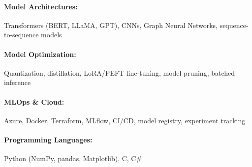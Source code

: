 \documentclass[10pt, letterpaper]{article}
\newenvironment{highlights}{
    \begin{itemize}[
        topsep=0.10 cm,
        parsep=0.10 cm,
        partopsep=0pt,
        itemsep=0pt,
        leftmargin=0 cm + 10pt
    ]
}{
    \end{itemize}
} %
\newenvironment{onecolentry}{
    \begin{adjustwidth}{
        0 cm + 0.00001 cm
    }{
        0 cm + 0.00001 cm
    }
}{
    \end{adjustwidth}
} %
\begin{document}
        \paragraph{Model Architectures:} Transformers (BERT, LLaMA, GPT), CNNs, Graph Neural Networks, sequence-to-sequence models
        \vspace{-4mm}
        \paragraph{Model Optimization:} Quantization, distillation, LoRA/PEFT fine-tuning, model pruning, batched inference
        \vspace{-4mm}
        \paragraph{MLOps \& Cloud:} Azure, Docker, Terraform, MLflow, CI/CD, model registry, experiment tracking
        \vspace{-4mm}
        \paragraph{Programming Languages:} Python (NumPy, pandas, Matplotlib), C, C\#

    
        

\end{document}
